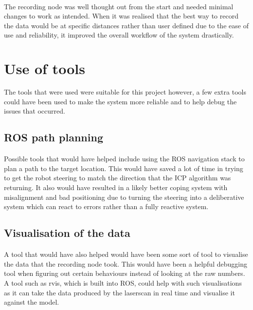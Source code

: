\paragraph{}
The recording node was well thought out from the start and needed minimal changes to work as intended. When it was realised that the best way to record the data would be at specific distances rather than user defined due to the ease of use and reliability, it improved the overall workflow of the system drastically.

\section{Use of tools}
The tools that were used were suitable for this project however, a few extra tools could have been used to make the system more reliable and to help debug the issues that occurred.

\subsection{ROS path planning}
\paragraph{}
Possible tools that would have helped include using the ROS navigation stack\cite{ROS-NAV} to plan a path to the target location. This would have saved a lot of time in trying to get the robot steering to match the direction that the ICP algorithm was returning. It also would have resulted in a likely better coping system with misalignment and bad positioning due to turning the steering into a deliberative system which can react to errors rather than a fully reactive system.

\subsection{Visualisation of the data}
\paragraph{}
A tool that would have also helped would have been some sort of tool to visualise the data that the recording node took. This would have been a helpful debugging tool when figuring out certain behaviours instead of looking at the raw numbers. A tool such as rvis\cite{RVIS}, which is built into ROS, could help with such visualisations as it can take the data produced by the laserscan in real time and visualise it against the model.

